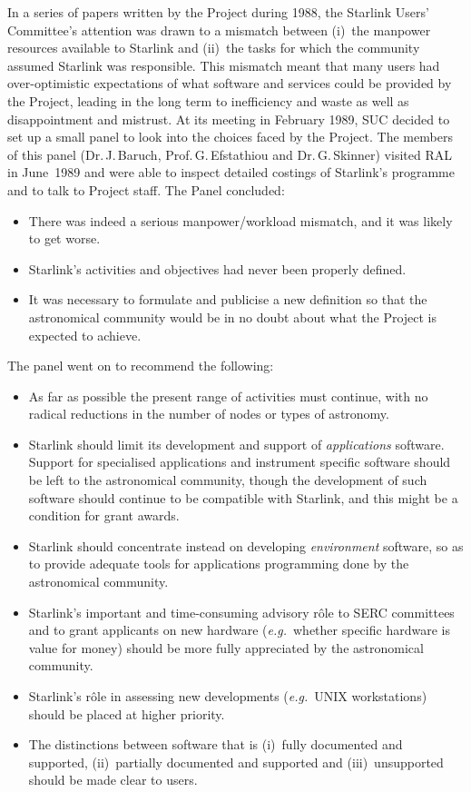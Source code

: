In a series of papers written by the Project during 1988,
the Starlink Users' Committee's attention was drawn
to a mismatch between
(i)~the manpower resources available to Starlink and
(ii)~the tasks for
which the community
assumed Starlink was responsible.
This mismatch meant that many users had
over-optimistic expectations of what
software and services could be provided by the
Project, leading in the long term to inefficiency and waste
as well as disappointment and mistrust.  At its meeting in
February 1989, SUC decided to set up a small panel
to look into the choices faced by the Project.
The members of this panel
(Dr.\,J.\,Baruch, Prof.\,G.\,Efstathiou and
Dr.\,G.\,Skinner)
visited RAL in June~1989 and were able
to inspect detailed costings of Starlink's programme
and to talk to Project staff.  The Panel concluded:
\begin{itemize}
\item There was indeed a serious manpower/workload mismatch, and it was
likely to get worse.
\item Starlink's activities and objectives had never been properly defined.
\item It was necessary to formulate and publicise a new definition so
that the astronomical
community would be in no doubt about what the Project is expected to achieve.
\end{itemize}
The panel went on to recommend the following:
\begin{itemize}
\item As far as possible
the present range of activities must continue,
with no radical reductions in
the number of nodes or types of astronomy.
\item Starlink should limit its development and support
of {\it applications} software.
Support for specialised
applications and instrument specific software
should be left to the astronomical community, though
the development of such software should continue to
be compatible with Starlink, and this might be a condition for 
grant awards.
\item Starlink should concentrate instead on developing
{\it environment} software, so as to provide adequate tools for
applications programming done by the
astronomical community.
\item Starlink's important and
time-consuming advisory r\^{o}le to 
SERC committees and to grant applicants on new 
hardware ({\it e.g.}\ whether specific hardware 
is value for money) should be more fully appreciated
by the astronomical community.
\item Starlink's r\^{o}le in assessing new 
developments ({\it e.g.}\ UNIX workstations) 
should be placed at higher priority.
\item The distinctions between software that is
(i)~fully documented and supported, (ii)~partially
documented and supported and (iii)~unsupported
should be made clear to users.
\end{itemize}
